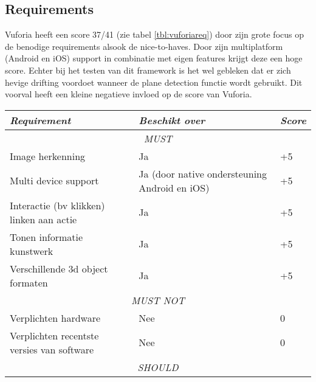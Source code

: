 \subsection{Requirements}
Vuforia heeft een score 37/41 (zie tabel \ref{tbl:vuforiareq}) door zijn grote focus op de benodige requirements alsook de nice-to-haves. Door zijn multiplatform (Android en iOS) support in combinatie met eigen features krijgt deze een hoge score. Echter bij het testen van dit framework is het wel gebleken dat er zich hevige drifting voordoet wanneer de plane detection functie wordt gebruikt. Dit voorval heeft een kleine negatieve invloed op de score van Vuforia.
\begin{table}[]
    \centering
    \begin{tabular}{@{}lll@{}}
        \toprule
        \textit{Requirement}                       & \textit{Beschikt over}                        & \textit{Score} \\ \midrule
        \multicolumn{3}{c}{\textit{MUST}}                                                                           \\ \midrule
        Image herkenning                           & Ja                                            & +5             \\
        Multi device support                       & Ja (door native ondersteuning Android en iOS) & +5             \\
        Interactie (bv klikken) linken aan actie   & Ja                                            & +5             \\
        Tonen informatie kunstwerk                 & Ja                                            & +5             \\
        Verschillende 3d object formaten           & Ja                                            & +5             \\ \midrule
        \multicolumn{3}{c}{\textit{MUST NOT}}                                                                       \\ \midrule
        Verplichten hardware                       & Nee                                           & 0              \\
        Verplichten recentste versies van software & Nee                                           & 0              \\ \midrule
        \multicolumn{3}{c}{\textit{SHOULD}}                                                                         \\ \midrule

\end{tabular}
\end{table}
